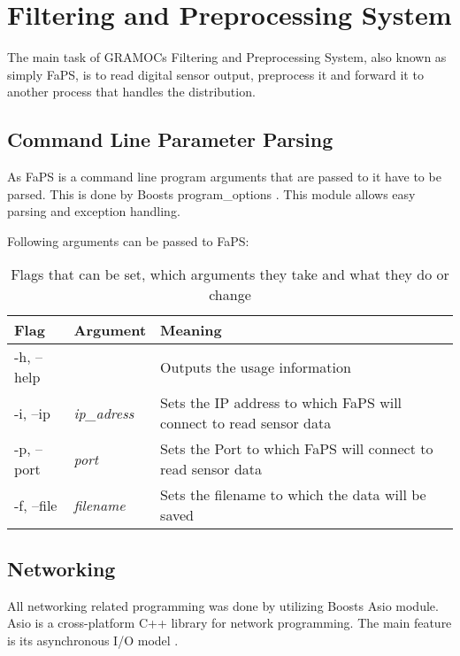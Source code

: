 \chapter{Filtering and Preprocessing System}
\label{ch:faps}

The main task of GRAMOCs Filtering and Preprocessing System, also known as simply FaPS, is to read digital sensor output, preprocess it and forward it to another process that handles the distribution.

\section{Command Line Parameter Parsing}

As FaPS is a command line program arguments that are passed to it have to be parsed. This is done by Boosts program\_options \cite{BoostProgramOptions}. This module allows easy parsing and exception handling.

Following arguments can be passed to FaPS:

\begin{table}[H]
    \centering
    \begin{tabular}{| l | l | p{5cm} |}
    \hline
    \textbf{Flag} & \textbf{Argument} & \textbf{Meaning} \\ \hline
    -h, --help & & Outputs the usage information \\ \hline
    -i, --ip & \textit{ip\_adress} & Sets the IP address to which FaPS will connect to read sensor data \\ \hline
    -p, --port & \textit{port} & Sets the Port to which FaPS will connect to read sensor data \\ \hline
    -f, --file & \textit{filename} & Sets the filename to which the data will be saved \\
    \hline
    \end{tabular}
    \caption{Flags that can be set, which arguments they take and what they do or change}
    \label{tab:faps_arguments}
\end{table}

\section{Networking}

All networking related programming was done by utilizing Boosts Asio module. Asio is a cross-platform C++ library for network programming. The main feature is its asynchronous I/O model \cite{BoostAsio}.

